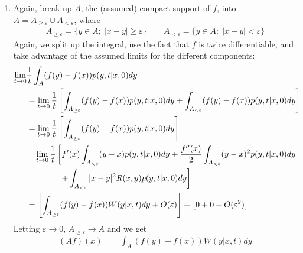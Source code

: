 \documentclass[12pt]{article}
\theoremstyle{plain}
\theoremstyle{definition}
\theoremstyle{remark}
\begin{document}
\begin{enumerate}
  \item %
    Again, break up $A$, the (assumed) compact support of $f$, into $A =
    A_{\geq\varepsilon} \cup A_{<\varepsilon}$, where
    \begin{align*}
      A_{\geq\varepsilon} = \{y \in A;\; |x-y| \geq \varepsilon\}
      \qquad
      A_{<\varepsilon} = \{y \in A:\; |x-y| < \varepsilon\}
    \end{align*}
    Again, we split up the integral, use the fact that $f$
    is twice differentiable, and take advantage of the assumed
    limits for the different components:
    \begin{align*}
      \lim_{t\rightarrow0} &\frac{1}{t}
      \int_A (f(y)-f(x))p(y,t|x,0) dy \\
      &= \lim_{t\rightarrow0} \frac{1}{t}
        \left[
        \int_{A_{\geq\varepsilon}} (f(y)-f(x))p(y,t|x,0) dy
        + \int_{A_{<\varepsilon}} (f(y)-f(x))p(y,t|x,0) dy
      \right]\notag\\
      &= \lim_{t\rightarrow0} \frac{1}{t}
        \left[
        \int_{A_{\geq\varepsilon}} (f(y)-f(x))p(y,t|x,0) dy \right]  \notag\\
      &\quad \lim_{t\rightarrow0} \frac{1}{t}
        \left[
         f'(x)\int_{A_{<\varepsilon}}
         (y-x) p(y,t|x,0) dy
        + \frac{f''(x)}{2} \int_{A_{<\varepsilon}}
          (y-x)^2 p(y,t|x,0) dy \right. \\
        & \qquad \qquad \left. +\int_{A_{<\varepsilon}}
          |x-y|^2R(x,y) p(y,t|x,0) dy
        \right]\\
      &=
        \left[
        \int_{A_{\geq\varepsilon}}
        (f(y)-f(x))W(y|x,t)dy  + O(\varepsilon)
        \right]
      + \left[ 0 + 0 + O(\varepsilon^2) \right]
    \end{align*}
    Letting $\varepsilon\to0$, $A_{\geq\varepsilon}\to A$ and we get
    \begin{align*}
      (Af)(x) 
      &=
        \int_{A}
        (f(y)-f(x))W(y|x,t)dy 
    \end{align*}

\end{enumerate}



\end{document}
